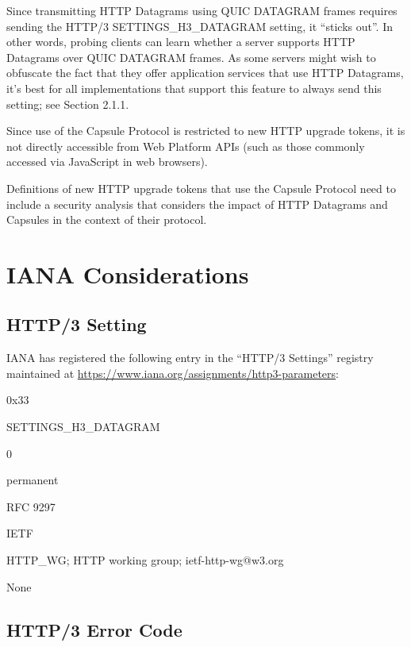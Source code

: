 \documentclass{article}
\begin{document}
Since transmitting HTTP Datagrams using QUIC DATAGRAM frames requires
sending the HTTP/3 SETTINGS\_H3\_DATAGRAM setting, it ``sticks out''.  In
other words, probing clients can learn whether a server supports HTTP
Datagrams over QUIC DATAGRAM frames.  As some servers might wish to
obfuscate the fact that they offer application services that use HTTP
Datagrams, it's best for all implementations that support this
feature to always send this setting; see Section 2.1.1.

Since use of the Capsule Protocol is restricted to new HTTP upgrade
tokens, it is not directly accessible from Web Platform APIs (such as
those commonly accessed via JavaScript in web browsers).

Definitions of new HTTP upgrade tokens that use the Capsule Protocol
need to include a security analysis that considers the impact of HTTP
Datagrams and Capsules in the context of their protocol.

\section{IANA Considerations}

\subsection{HTTP/3 Setting}

IANA has registered the following entry in the ``HTTP/3 Settings''
registry maintained at \url{https://www.iana.org/assignments/http3-parameters}:

\begin{description}[style=unboxed, leftmargin=0.5cm]
\item[Value:]  0x33
\item[Setting Name:]  SETTINGS\_H3\_DATAGRAM
\item[Default:]  0
\item[Status:]  permanent
\item[Reference:]  RFC 9297
\item[Change Controller:]  IETF
\item[Contact:]  HTTP\_WG; HTTP working group; ietf-http-wg@w3.org
\item[Notes:]  None
\end{description}

\subsection{HTTP/3 Error Code}
\end{document}
